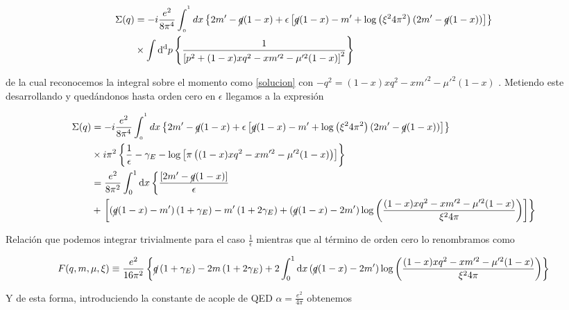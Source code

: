 \documentclass[tickz]{article}
\numberwithin{equation}{section}
\begin{document}
\begin{equation}
\begin{aligned}
\Sigma(q)&=-i\frac{e^2}{8\pi^4}\int_{_{0}}^{^{1}}dx \left\{ 2m' - \cancel{q}(1-x) + \epsilon\left[ \cancel{q}(1-x) - m' + \log\left(\xi^2 4 \pi^2\right) \left(2m' - \cancel{q}(1-x)\right)\right]\right\}\\
&\times \int\mathrm{d^d}p\left\{\frac{1}{\left[p^{2}+(1-x)xq^{2}-xm'^{2}-\mu'^{2}(1-x)\right]^{2}}\right\}
\end{aligned}
\end{equation}

de la cual reconocemos la integral sobre el momento como \ref{solucion} con $ -q^2=(1-x)xq^{2}-xm'^{2}-\mu'^{2}(1-x)  $ . Metiendo este desarrollando y quedándonos hasta orden cero en $ \epsilon $ llegamos a la expresión

\begin{equation}
\begin{aligned}
\Sigma(q)&=-i\frac{e^2}{8\pi^4}\int_{_{0}}^{^{1}}dx \left\{ 2m' - \cancel{q}(1-x) + \epsilon\left[ \cancel{q}(1-x) - m' + \log\left(\xi^2 4 \pi^2\right) \left(2m' - \cancel{q}(1-x)\right)\right]\right\}\\
&\times i\pi^2\left\{ \frac{1}{\epsilon} - \gamma_E -\log\left[\pi\left((1-x)xq^{2}-xm'^{2}-\mu'^{2}(1-x)\right)\right] \right\}\\
&=\frac{e^2}{8\pi^2}\int_{0}^{1}\mathrm{d}x \left\{ \frac{\left[2m' - \cancel{q}(1-x)\right]}{\epsilon} \right. \\
&+ \left. \left[ \left(\cancel{q}(1-x) - m' \right)\left(1+\gamma_E\right) - m'\left(1 + 2\gamma_E\right) + \left(\cancel{q}(1-x) - 2m'\right) \log \left(\frac{(1-x)xq^{2}-xm'^{2}-\mu'^{2}(1-x)}{\xi^24\pi}\right)\right] \right\}
\end{aligned}
\end{equation}

Relación que podemos integrar trivialmente para el caso $ \frac{1}{\epsilon} $ mientras que al término de orden cero lo renombramos como

\begin{equation}\label{key}
F(q,m,\mu,\xi)\equiv \frac{e^2}{16\pi^2} \left\{\cancel{q}\left(1+\gamma_E\right) - 2m\left(1+2\gamma_E\right) + 2\int_{0}^{1}\mathrm{d}x  \left(\cancel{q}(1-x) - 2m'\right) \log \left(\frac{(1-x)xq^{2}-xm'^{2}-\mu'^{2}(1-x)}{\xi^24\pi}\right)  \right\}
\end{equation}

Y de esta forma, introduciendo la constante de acople de QED $ \alpha = \frac{e^2}{4\pi} $ obtenemos
\end{document}
